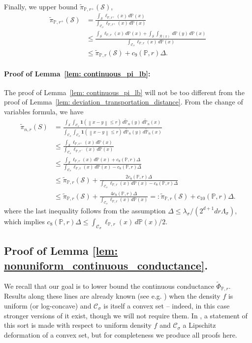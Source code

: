 \documentclass[11pt,twoside]{article}
\newcommand{\norm}[1]{\left\lVert#1\right\rVert}
\newcommand{\1}{\mathbf{1}}
\newcommand{\Pbb}{\mathbb{P}}
\newcommand{\Sset}{\mathcal{S}}
\newcommand{\Cset}{\mathcal{C}}
\newcommand{\Csig}{\Cset_{\sigma}}
\begin{document}
Finally, we upper bound $\widetilde{\pi}_{\Pbb,r^{+}}(\Sset)$,
\begin{align*}
\widetilde{\pi}_{\Pbb,r^{+}}(\Sset) & = \frac{\int_{\Sset} \ell_{\Pbb,r^+}(x) \,d\Pbb(x)}{\int_{\Csig} \ell_{\Pbb,r^+}(x) \,d\Pbb(x)} \\
& \leq \frac{\int_{\Sset} \ell_{\Pbb,r}(x) \,d\Pbb(x) + \int_{\Sset} \int_{\mathcal{R}(x)} \,d\Pbb(y) \,d\Pbb(x)}{\int_{\Csig} \ell_{\Pbb,r}(x) \,d\Pbb(x)} \\
& \leq \widetilde{\pi}_{\Pbb,r}(\Sset) + c_9(\Pbb,r)\varDelta.
\end{align*}

\paragraph{Proof of Lemma~\ref{lem: continuous_pi_lb}: }
The proof of Lemma~\ref{lem: continuous_pi_lb} will not be too different from the proof of Lemma~\ref{lem: deviation_transportation_distance}. From the change of variables formula, we have
\begin{align*}
\widetilde{\pi}_{n,r}(S) & = \frac{\int_{\Sset}\int_{\Csig} \1(\norm{x - y} \leq r) \,d\widetilde{\Pbb}_n(y) \,d\widetilde{\Pbb}_n(x)}{\int_{\Csig}\int_{\Csig} \1(\norm{x - y} \leq r) \,d\widetilde{\Pbb}_n(y) \,d\widetilde{\Pbb}_n(x)} \\
& \leq \frac{\int_{\Sset} \ell_{\Pbb,r^+}(x) \,d\Pbb(x) }{\int_{\Csig}\ell_{\Pbb,r^-}(x) \,d\Pbb(x)} \\
& \leq \frac{\int_{\Sset} \ell_{\Pbb,r}(x) \,d\Pbb(x) + c_8(\Pbb,r)\varDelta}{\int_{\Csig} \ell_{\Pbb,r}(x) \,d\Pbb(x) - c_8(\Pbb,r)\varDelta} \\
& \leq \widetilde{\pi}_{\Pbb,r}(\Sset) + \frac{2c_8(\Pbb,r)\varDelta}{\int_{\Csig} \ell_{\Pbb,r}(x) \,d\Pbb(x) - c_8(\Pbb,r)\varDelta} \\
& \leq \widetilde{\pi}_{\Pbb,r}(\Sset) + \frac{4c_8(\Pbb,r)\varDelta}{\int_{\Csig} \ell_{\Pbb,r}(x) \,d\Pbb(x)} =: \widetilde{\pi}_{\Pbb,r}(\Sset) + c_{10}(\Pbb,r) \varDelta.
\end{align*}
where the last inequality follows from the assumption $\varDelta \leq \lambda_{\sigma}/(2^{d + 1} dr\Lambda_{\sigma})$, which implies $c_8(\Pbb,r)\varDelta \leq \int_{\Csig}\ell_{\Pbb,r}(x) \,d\Pbb(x) / 2$.

\subsection{Proof of Lemma \ref{lem: nonuniform_continuous_conductance}. }
We recall that our goal is to lower bound the continuous conductance $\widetilde{\Phi}_{\Pbb,r}$. Results along these lines are already known (see e.g. \cite{kannan04}) when the density $f$ is uniform (or log-concave) and $\Csig$ is itself a convex set -- indeed, in this case stronger versions of it exist, though we will not require them. In \cite{abbasi-yadkori2016a}, a statement of this sort is made with respect to uniform density $f$ and $\Csig$ a Lipschitz deformation of a convex set, but for completeness we produce all proofs here.
\end{document}

